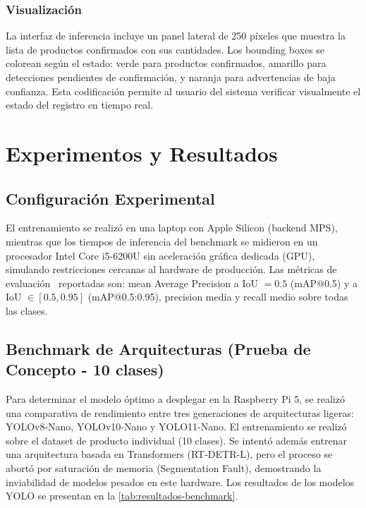 \documentclass[conference,a4paper]{IEEEtran}[2015/08/26]
\begin{document}
\subsubsection{Visualización}

La interfaz de inferencia incluye un panel lateral de 250 píxeles que muestra la lista de productos confirmados con sus cantidades. Los bounding boxes se colorean según el estado: verde para productos confirmados, amarillo para detecciones pendientes de confirmación, y naranja para advertencias de baja confianza. Esta codificación permite al usuario del sistema verificar visualmente el estado del registro en tiempo real.

\section{Experimentos y Resultados}
\label{sec:experimentos}

\subsection{Configuración Experimental}

El entrenamiento se realizó en una laptop con Apple Silicon (backend MPS), mientras que los tiempos de inferencia del benchmark se midieron en un procesador Intel Core i5-6200U sin aceleración gráfica dedicada (GPU), simulando restricciones cercanas al hardware de producción. Las métricas de evaluación~\cite{everingham2010pascal} reportadas son: mean Average Precision a IoU $= 0.5$ (mAP@0.5) y a IoU $\in [0.5, 0.95]$ (mAP@0.5:0.95), precision media y recall medio sobre todas las clases.

\subsection{Benchmark de Arquitecturas (Prueba de Concepto - 10 clases)}

Para determinar el modelo óptimo a desplegar en la Raspberry Pi 5, se realizó una comparativa de rendimiento entre tres generaciones de arquitecturas ligeras: YOLOv8-Nano, YOLOv10-Nano y YOLO11-Nano. El entrenamiento se realizó sobre el dataset de producto individual (10 clases). Se intentó además entrenar una arquitectura basada en Transformers (RT-DETR-L), pero el proceso se abortó por saturación de memoria (Segmentation Fault), demostrando la inviabilidad de modelos pesados en este hardware. Los resultados de los modelos YOLO se presentan en la \cref{tab:resultados-benchmark}.
\end{document}
